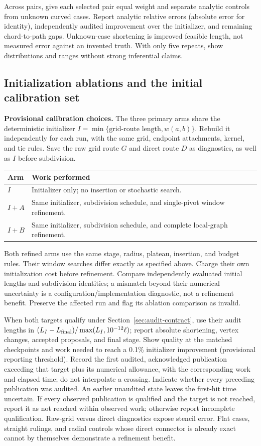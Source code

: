 \documentclass[11pt,letterpaper]{article}
\begin{document}
Across pairs, give each selected pair equal weight and separate analytic controls from unknown curved cases. Report analytic relative errors (absolute error for identity), independently audited improvement over the initializer, and remaining chord-to-path gaps. Unknown-case shortening is improved feasible length, not measured error against an invented truth. With only five repeats, show distributions and ranges without strong inferential claims.

\subsection{Initialization ablations and the initial calibration set}
\textbf{Provisional calibration choices.} The three primary arms share the deterministic initializer $I=\min\{\text{grid-route length},w(a,b)\}$. Rebuild it independently for each run, with the same grid, endpoint attachments, kernel, and tie rules. Save the raw grid route $G$ and direct route $D$ as diagnostics, as well as $I$ before subdivision.

\begin{tabularx}{\textwidth}{@{}l>{\raggedright\arraybackslash}X@{}}
\toprule
Arm & Work performed\\
\midrule
$I$ & Initializer only; no insertion or stochastic search.\\
$I+A$ & Same initializer, subdivision schedule, and single-pivot window refinement.\\
$I+B$ & Same initializer, subdivision schedule, and complete local-graph refinement.\\
\bottomrule
\end{tabularx}

Both refined arms use the same stage, radius, plateau, insertion, and budget rules. Their window searches differ exactly as specified above. Charge their own initialization cost before refinement. Compare independently evaluated initial lengths and subdivision identities; a mismatch beyond their numerical uncertainty is a configuration/implementation diagnostic, not a refinement benefit. Preserve the affected run and flag its ablation comparison as invalid.

When both targets qualify under Section~\ref{sec:audit-contract}, use their audit lengths in $(L_I-L_{\rm final})/\max(L_I,10^{-12}\ell)$; report absolute shortening, vertex changes, accepted proposals, and final stage. Show quality at the matched checkpoints and work needed to reach a 0.1\% initializer improvement (provisional reporting threshold). Record the first audited, acknowledged publication exceeding that target plus its numerical allowance, with the corresponding work and elapsed time; do not interpolate a crossing. Indicate whether every preceding publication was audited. An earlier unaudited state leaves the first-hit time uncertain. If every observed publication is qualified and the target is not reached, report it as not reached within observed work; otherwise report incomplete qualification. Raw-grid versus direct diagnostics expose stencil error. Flat cases, straight rulings, and radial controls whose direct connector is already exact cannot by themselves demonstrate a refinement benefit.
\end{document}
